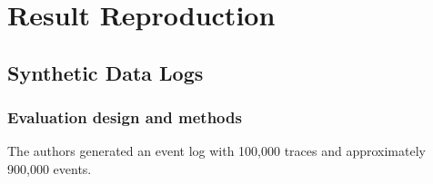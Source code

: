 
\chapter{Result Reproduction} %

\label{Chapter3} %






\section{Synthetic Data Logs}

\subsection{Evaluation design and methods}
The authors generated an event log with 100,000 traces and approximately 900,000 events.\\

